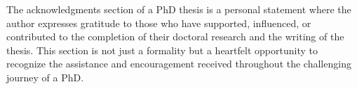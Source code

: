 
The acknowledgments section of a PhD thesis is a personal statement where the author expresses gratitude to those who have supported, influenced, or contributed to the completion of their doctoral research and the writing of the thesis.
This section is not just a formality but a heartfelt opportunity to recognize the assistance and encouragement received throughout the challenging journey of a PhD.